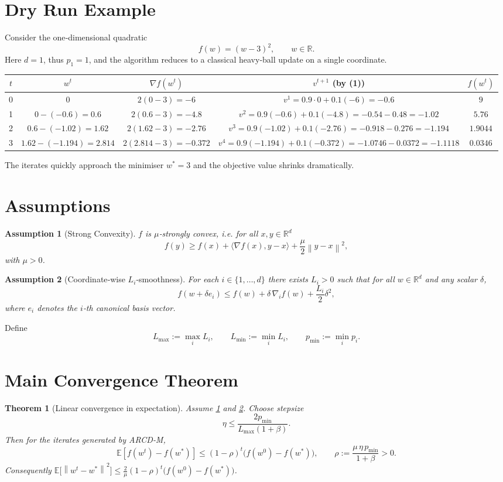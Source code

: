 \documentclass{article}
\newtheorem{theorem}{Theorem}
\newtheorem{assumption}{Assumption}
\newcommand{\E}{\mathbb{E}}
\newcommand{\R}{\mathbb{R}}
\newcommand{\norm}[1]{\left\|#1\right\|}
\newcommand{\ip}[2]{\langle #1,#2\rangle}
\newcommand{\grad}[1]{\nabla #1}
\begin{document}
\section*{Dry Run Example}
Consider the one‑dimensional quadratic 
\[
    f(w)=(w-3)^{2},\qquad w\in\R .
\]
Here $d=1$, thus $p_1=1$, and the algorithm reduces to a classical heavy‑ball update on a single coordinate.

\begin{center}
\begin{tabular}{c|c|c|c|c}
$t$ & $w^{t}$ & $\nabla f(w^{t})$ & $v^{t+1}$ (by (1)) & $f(w^{t})$\\ \hline
0 & $0$ & $2(0-3)=-6$ & $v^{1}=0.9\cdot0+0.1(-6)=-0.6$ & $9$\\
1 & $0-(-0.6)=0.6$ & $2(0.6-3)=-4.8$ & $v^{2}=0.9(-0.6)+0.1(-4.8)=-0.54-0.48=-1.02$ & $5.76$\\
2 & $0.6-(-1.02)=1.62$ & $2(1.62-3)=-2.76$ & $v^{3}=0.9(-1.02)+0.1(-2.76)=-0.918-0.276=-1.194$ & $1.9044$\\
3 & $1.62-(-1.194)=2.814$ & $2(2.814-3)=-0.372$ & $v^{4}=0.9(-1.194)+0.1(-0.372)=-1.0746-0.0372=-1.1118$ & $0.0346$
\end{tabular}
\end{center}
The iterates quickly approach the minimiser $w^{*}=3$ and the objective value shrinks dramatically.

\section*{Assumptions}
\begin{assumption}[Strong Convexity]\label{as:strong}
$f$ is $\mu$‑strongly convex, i.e. for all $x,y\in\R^{d}$
\[
    f(y)\ge f(x)+\ip{\grad f(x)}{y-x}+\frac{\mu}{2}\norm{y-x}^{2},
\]
with $\mu>0$.
\end{assumption}
\begin{assumption}[Coordinate‑wise $L_i$‑smoothness]\label{as:smooth}
For each $i\in\{1,\dots ,d\}$ there exists $L_i>0$ such that for all $w\in\R^{d}$ and any scalar $\delta$,
\[
    f(w+ \delta e_i)\le f(w)+\delta \,\nabla_i f(w)+\frac{L_i}{2}\delta^{2},
\]
where $e_i$ denotes the $i$‑th canonical basis vector.
\end{assumption}
Define
\[
    L_{\max}:=\max_{i}L_i,\qquad L_{\min}:=\min_{i}L_i,\qquad p_{\min}:=\min_{i}p_i .
\]

\section*{Main Convergence Theorem}
\begin{theorem}[Linear convergence in expectation]\label{thm:linear}
Assume \ref{as:strong} and \ref{as:smooth}. Choose stepsize 
\[
    \eta\le \frac{2p_{\min}}{L_{\max}(1+\beta)} . \tag{4}
\]
Then for the iterates generated by ARCD‑M,
\[
    \E\!\left[f(w^{t})-f(w^{*})\right]\le (1-\rho)^{t}\bigl(f(w^{0})-f(w^{*})\bigr),\qquad 
    \rho:=\frac{\mu\,\eta\,p_{\min}}{1+\beta}>0 . \tag{5}
\]
Consequently $\E\!\bigl[\norm{w^{t}-w^{*}}^{2}\bigr]\le \frac{2}{\mu}(1-\rho)^{t}\bigl(f(w^{0})-f(w^{*})\bigr)$.
\end{theorem}
\end{document}
